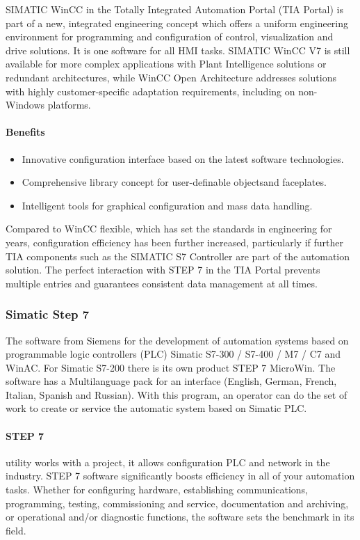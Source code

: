 \documentclass[english]{article}
\begin{document}
SIMATIC WinCC in the Totally Integrated Automation Portal (TIA Portal) is part of a new, integrated engineering concept which offers a uniform engineering environment for programming and configuration of control, visualization and drive solutions. It is one software for all HMI tasks. SIMATIC WinCC V7 is still available for more complex applications with Plant Intelligence solutions or redundant architectures, while WinCC Open Architecture addresses solutions with highly customer-specific adaptation requirements, including on non-Windows platforms. 
\paragraph{Benefits}
\begin{itemize}
\item Innovative configuration interface based on the latest software technologies.
\item Comprehensive library concept for user-definable objectsand faceplates.
\item Intelligent tools for graphical configuration and mass data handling.
\end{itemize}

Compared to WinCC flexible, which has set the standards in engineering for years, configuration efficiency has been further increased, particularly if further TIA components such as the SIMATIC S7 Controller are part of the automation solution. The perfect interaction with STEP 7 in the TIA Portal prevents multiple entries and guarantees consistent data management at all times.

\subsubsection{Simatic Step 7}
 The software from Siemens for the development of automation systems based on programmable logic controllers (PLC) Simatic S7-300 / S7-400 / M7 / C7 and WinAC. For Simatic S7-200 there is its own product STEP 7 MicroWin. The software has a Multilanguage pack for an interface (English, German, French, Italian, Spanish and Russian). With this program, an operator can do the set of work to create or service the automatic system based on Simatic PLC.\\ 

\paragraph{STEP 7} utility works with a project, it allows configuration PLC and network in the industry. STEP 7 software significantly boosts efficiency in all of your automation tasks. Whether for configuring hardware, establishing communications, programming, testing, commissioning and service, documentation and archiving, or operational and/or diagnostic functions, the software sets the benchmark in its field.\\
\end{document}
